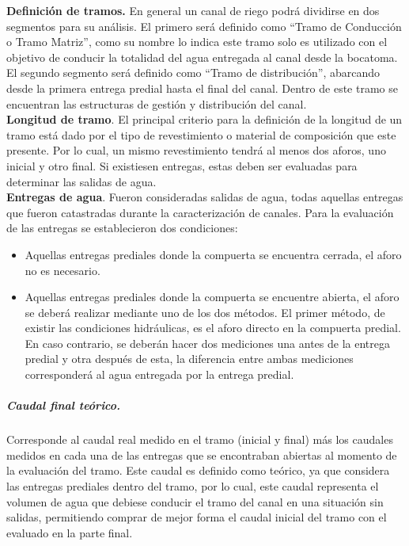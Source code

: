 \documentclass[]{article}
\begin{document}
\textbf{Definición de tramos.} En general un canal de riego podrá dividirse en dos segmentos para su análisis. El primero será definido como “Tramo de Conducción o Tramo Matriz”, como su nombre lo indica este tramo solo es utilizado con el objetivo de conducir la totalidad del agua entregada al canal desde la bocatoma. El segundo segmento será definido como “Tramo de distribución”, abarcando desde la primera entrega predial hasta el final del canal. Dentro de este tramo se encuentran las estructuras de gestión y distribución del canal.\\

\textbf{Longitud de tramo}. El principal criterio para la definición de la longitud de un tramo está dado por el tipo de revestimiento o material de composición que este presente. Por lo cual, un mismo revestimiento tendrá al menos dos aforos, uno inicial y otro final. Si existiesen entregas, estas deben ser evaluadas para determinar las salidas de agua.\\

\textbf{Entregas de agua}. Fueron consideradas salidas de agua, todas aquellas entregas que fueron catastradas durante la caracterización de canales. Para la evaluación de las entregas se establecieron dos condiciones:
\begin{itemize}
\item Aquellas entregas prediales donde la compuerta se encuentra cerrada, el aforo no es necesario.
\item Aquellas entregas prediales donde la compuerta se encuentre abierta, el aforo se deberá realizar mediante uno de los dos métodos. El primer método, de existir las condiciones hidráulicas, es el aforo directo en la compuerta predial. En caso contrario, se deberán hacer dos mediciones una antes de la entrega predial y otra después de esta, la diferencia entre ambas mediciones corresponderá al agua entregada por la entrega predial.
\end{itemize}

\subparagraph{Caudal final teórico.}
Corresponde al caudal real medido en el tramo (inicial y final) más los caudales medidos en cada una de las entregas que se encontraban abiertas al momento de la evaluación del tramo. Este caudal es definido como teórico, ya que considera las entregas prediales dentro del tramo, por lo cual, este caudal representa el volumen de agua que debiese conducir el tramo del canal en una situación sin salidas, permitiendo comprar de mejor forma el caudal inicial del tramo con el evaluado en la parte final.\\
\end{document}
